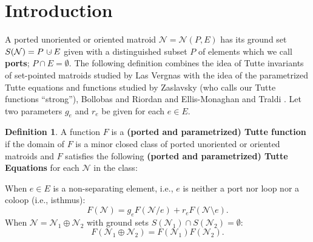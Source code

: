 \documentclass[12pt]{article}
\theoremstyle{definition}
\newtheorem{definition}[theorem]{Definition}
\newcommand{\dunion}
{\mbox{\hbox{\hskip6pt$\cdot$\hskip-5.50pt$\cup$\hskip2pt}}}
\begin{document}
\newpage

\tableofcontents

\section{Introduction}

A ported unoriented or oriented matroid 
$\mathcal{N}=\mathcal{N}(P,E)$ 
has its ground set 
$S(\mathcal{N})=P\dunion E$ given with a distinguished
subset $P$ of elements which we call \textbf{ports}; $P\cap E=\emptyset$.
The following definition 
combines the idea of Tutte invariants of set-pointed matroids
studied by Las Vergnas
\cite{MR0419272,TPMorphMat80,SetPointedLV}
with the idea of the parametrized Tutte equations and functions 
studied by 
Zaslavsky\cite{MR93a:05047} (who calls our Tutte functions ``strong''), 
Bollobas and 
Riordan\cite{BollobasRiordanTuttePolyColored} and
Ellis-Monaghan and Traldi \cite{Ellis-Monaghan-Traldi}.
Let two parameters $g_e$ and $r_e$ be given for each $e\in E$.

\begin{definition}
\label{firstTutteFunction}
A function $F$ is a 
\textbf{(ported and parametrized) Tutte function}
if the domain of  $F$ is 
a minor closed class
of ported unoriented or oriented matroids and
$F$ satisfies the following
\textbf{(ported and parametrized) Tutte Equations}
for each $\mathcal{N}$ in the class:


When $e\in E$ is a non-separating element, i.e.,
$e$ is neither a port nor loop nor a coloop (i.e., isthmus):
\begin{equation}\label{TGplus}
	F(\mathcal{N}) = g_eF(\mathcal{N}/ e) + r_eF(\mathcal{N}\setminus e).
\end{equation}
When $\mathcal{N}=\mathcal{N}_1\oplus\mathcal{N}_2$
with ground sets $S(\mathcal{N}_1)\cap S(\mathcal{N}_2)=\emptyset$:
\begin{equation}\label{TGtimes}
	F(\mathcal{N}_1\oplus\mathcal{N}_2) = F(\mathcal{N}_1)F(\mathcal{N}_2).
\end{equation}


\end{definition}
\end{document}
